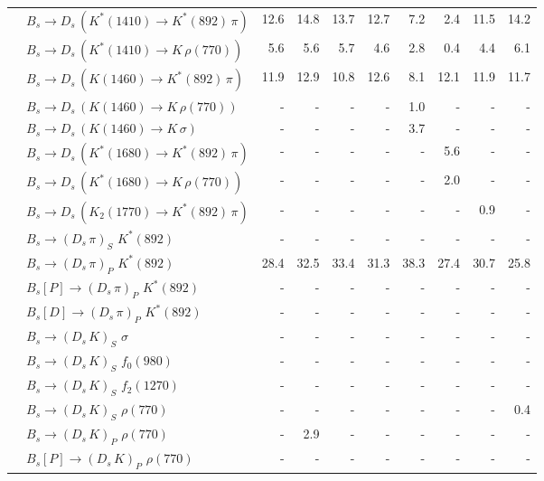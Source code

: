 \begin{tabular}{l l  r  r  r  r  r  r  r  r  }
 & $B_s \to D_s \, ( K^{*}(1410) \to K^{*}(892) \, \pi )$ & 12.6 & 14.8 & 13.7 & 12.7 & 7.2 & 2.4 & 11.5 & 14.2 \\ 
 & $B_s \to D_s \, ( K^{*}(1410) \to K \, \rho(770) )$ & 5.6 & 5.6 & 5.7 & 4.6 & 2.8 & 0.4 & 4.4 & 6.1 \\ 
 & $B_s \to D_s \, ( K(1460) \to K^{*}(892) \, \pi )$ & 11.9 & 12.9 & 10.8 & 12.6 & 8.1 & 12.1 & 11.9 & 11.7 \\ 
 & $B_s \to D_s \, ( K(1460) \to K \, \rho(770) )$ & -  & -  & -  & -  & 1.0 & -  & -  & -  \\ 
 & $B_s \to D_s \, ( K(1460) \to K \, \sigma )$ & -  & -  & -  & -  & 3.7 & -  & -  & -  \\ 
 & $B_s \to D_s \, ( K^{*}(1680) \to K^{*}(892) \, \pi )$ & -  & -  & -  & -  & -  & 5.6 & -  & -  \\ 
 & $B_s \to D_s \, ( K^{*}(1680) \to K \, \rho(770) )$ & -  & -  & -  & -  & -  & 2.0 & -  & -  \\ 
 & $B_s \to D_s \, ( K_2(1770) \to K^{*}(892) \, \pi )$ & -  & -  & -  & -  & -  & -  & 0.9 & -  \\ 
 & $B_s \to ( D_s \, \pi)_{S} \, \, K^{*}(892)$ & -  & -  & -  & -  & -  & -  & -  & -  \\ 
 & $B_s \to ( D_s \, \pi)_{P} \, \, K^{*}(892)$ & 28.4 & 32.5 & 33.4 & 31.3 & 38.3 & 27.4 & 30.7 & 25.8 \\ 
 & $B_s[P] \to ( D_s \, \pi)_{P} \, \, K^{*}(892)$ & -  & -  & -  & -  & -  & -  & -  & -  \\ 
 & $B_s[D] \to ( D_s \, \pi)_{P} \, \, K^{*}(892)$ & -  & -  & -  & -  & -  & -  & -  & -  \\ 
 & $B_s \to ( D_s \, K)_{S} \, \, \sigma$ & -  & -  & -  & -  & -  & -  & -  & -  \\ 
 & $B_s \to ( D_s \, K)_{S} \, \, f_0(980)$ & -  & -  & -  & -  & -  & -  & -  & -  \\ 
 & $B_s \to ( D_s \, K)_{S} \, \, f_2(1270)$ & -  & -  & -  & -  & -  & -  & -  & -  \\ 
 & $B_s \to ( D_s \, K)_{S} \, \, \rho(770)$ & -  & -  & -  & -  & -  & -  & -  & 0.4 \\ 
 & $B_s \to ( D_s \, K)_{P} \, \, \rho(770)$ & -  & 2.9 & -  & -  & -  & -  & -  & -  \\ 
 & $B_s[P] \to ( D_s \, K)_{P} \, \, \rho(770)$ & -  & -  & -  & -  & -  & -  & -  & -  \\ 

\end{tabular}
